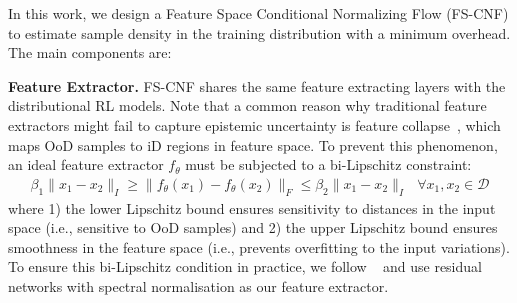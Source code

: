 \documentclass{article}
\newcommand{\datapoint}{x}
\newcommand{\dataset}{\mathcal{D}}
\begin{document}
In this work, we design a Feature Space Conditional Normalizing Flow (FS-CNF) to estimate sample density in the training distribution with a minimum overhead. The main components are:

\noindent\textbf{Feature Extractor.} FS-CNF shares the same feature extracting layers with the distributional RL models. 
Note that a common reason why traditional feature extractors might fail to capture epistemic uncertainty is feature collapse~\cite{Amersfoort2020FeatureCollapse}, which maps OoD samples to iD regions in feature space. To prevent this phenomenon, an ideal feature extractor $f_{\theta}$ must be subjected to a bi-Lipschitz constraint:
\begin{align}
\beta_{1}\|\datapoint_{1}-\datapoint_{2}\|_{I}\geq\|f_{\theta}(\datapoint_{1})-f_{\theta}(\datapoint_{2})\|_{F}\leq\beta_{2}\|\datapoint_{1}-\datapoint_{2}\|_{I}\text{ }\forall{\datapoint_{1},\datapoint_{2}\in\dataset}
\end{align}
where 1) the lower Lipschitz bound ensures sensitivity to distances in the input space (i.e., sensitive to OoD samples) and 2) the upper Lipschitz bound ensures smoothness in the feature space (i.e., prevents overfitting to the input variations). To ensure this bi-Lipschitz condition in practice, we follow ~\cite{Amersfoort2020FeatureCollapse} and use residual networks with spectral normalisation as our feature extractor.
\end{document}
